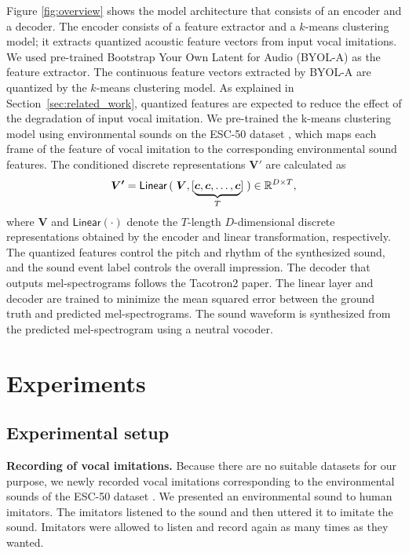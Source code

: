 \documentclass{article}
\begin{document}
Figure \ref{fig:overview} shows the model architecture that consists of an encoder and a decoder.
The encoder consists of a feature extractor and a $k$-means clustering model; it extracts quantized acoustic feature vectors from input vocal imitations.
We used pre-trained Bootstrap Your Own Latent for Audio (BYOL-A) \cite{Daisuke_TASLP_2023} as the feature extractor.
The continuous feature vectors extracted by BYOL-A are quantized by the $k$-means clustering model.
As explained in Section~\ref{sec:related_work}, quantized features are expected to reduce the effect of the degradation of input vocal imitation.
We pre-trained the k-means clustering model using environmental sounds on the ESC-50 dataset \cite{Piczak_CoM2_015}, which maps each frame of the feature of vocal imitation to the corresponding environmental sound features.
The conditioned discrete representations $\bm{V'}$ are calculated as 
\begin{equation}
\bm{V'}=\mathsf{Linear}\left(\vphantom{\bm{V},\left[\vphantom{\bm{c},\bm{c},\dots,\bm{c}}\right.}\right.
\bm{V},[\underbrace{\bm{c},\bm{c},\dots,\bm{c}}_{T}]
\left.\vphantom{\bm{V},\left.\vphantom{\bm{c},\bm{c},\dots,\bm{c}}\right]}\right)\in\mathbb{R}^{D\times T},
\end{equation}
where $\bm{V}$ and $\mathsf{Linear}(\cdot)$ denote the $T$-length $D$-dimensional discrete representations obtained by the encoder and linear transformation, respectively.
The quantized features control the pitch and rhythm of the synthesized sound, and the sound event label controls the overall impression.
The decoder that outputs mel-spectrograms follows the Tacotron2 \cite{Shen_ICASSP_2018} paper. 
The linear layer and decoder are trained to minimize the mean squared error between the ground truth and predicted mel-spectrograms.
The sound waveform is synthesized from the predicted mel-spectrogram using a neutral vocoder.

%
\vspace{-3pt}
\section{Experiments}
\vspace{-3pt}
\label{sec:experiments}
%
\subsection{Experimental setup}
\vspace{-3pt}
\textbf{Recording of vocal imitations.}
Because there are no suitable datasets for our purpose, we newly recorded vocal imitations corresponding to the environmental sounds of the ESC-50 dataset \cite{Piczak_CoM2_015}.
We presented an environmental sound to human imitators.
The imitators listened to the sound and then uttered it to imitate the sound. 
Imitators were allowed to listen and record again as many times as they wanted. 
\end{document}

